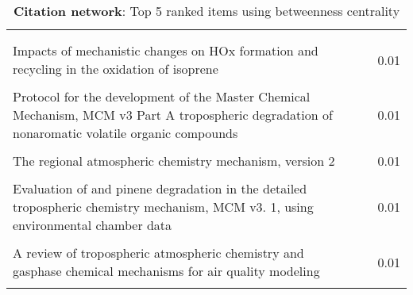 \begin{table}[H]
     \begin{tabular}{p{}p{}c}
     \toprule
      & & \\\\
     Impacts of mechanistic changes on HOx formation and recycling in the oxidation of isoprene & \cite{betweenness0} & 0.01  \\ \\
        Protocol for the development of the Master Chemical Mechanism, MCM v3 Part A tropospheric degradation of nonaromatic volatile organic compounds & \cite{betweenness1} & 0.01  \\ \\
        The regional atmospheric chemistry mechanism, version 2 & \cite{betweenness2} & 0.01  \\ \\
        Evaluation of and pinene degradation in the detailed tropospheric chemistry mechanism, MCM v3. 1, using environmental chamber data & \cite{betweenness3} & 0.01  \\ \\
        A review of tropospheric atmospheric chemistry and gasphase chemical mechanisms for air quality modeling & \cite{betweenness4} & 0.01  \\ \\
        \bottomrule
    \end{tabular}
    \label{tab:betweenness_Citation}
    \caption{\textbf{Citation network}: Top 5 ranked items using betweenness centrality}
    \end{table}

    